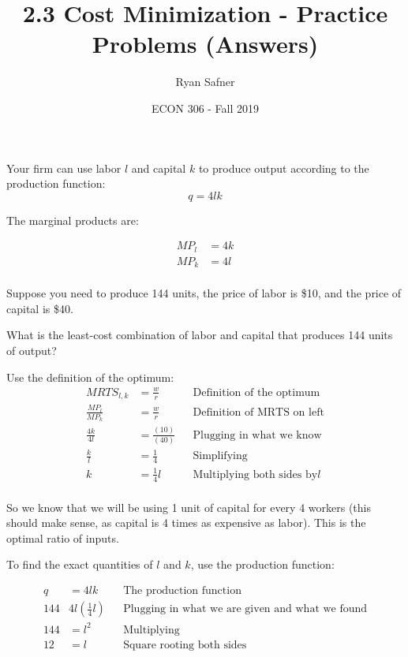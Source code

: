 \documentclass[12 pt]{exam}
\title{2.3 Cost Minimization - Practice Problems (Answers)}
\author{Ryan Safner}
\date{ECON 306 - Fall 2019}
\begin{document}
\maketitle

Your firm can use labor $l$ and capital $k$ to produce output according to the production function:
$$q=4lk$$


The marginal products are:

$$\begin{aligned}
MP_l &=4k \\
MP_k &=4l \\ \end{aligned}$$

Suppose you  need to produce 144 units, the price of labor is \$10, and the price of capital is \$40. 

\begin{questions}

\question What is the least-cost combination of labor and capital that produces 144 units of output?

  \begin{solution}
  	Use the definition of the optimum: 
\begin{align*}
MRTS_{l,k}&=\frac{w}{r} & & \text{Definition of the optimum}\\
\frac{MP_l}{MP_k}&=\frac{w}{r} && \text{Definition of MRTS on left}\\
\frac{4k}{4l} &=\frac{(10)}{(40)} & & \text{Plugging in what we know}\\
		\frac{k}{l}&=\frac{1}{4} && \text{Simplifying}\\
	k&=\frac{1}{4}l && \text{Multiplying both sides by} l\\	
\end{align*}

So we know that we will be using 1 unit of capital for every 4 workers (this should make sense, as capital is 4 times as expensive as labor). This is the optimal ratio of inputs. 

To find the exact quantities of $l$ and $k$, use the production function:

\begin{align*}
q&=4lk & & \text{The production function}\\
144&4l(\frac{1}{4}l) & & \text{Plugging in what we are given and what we found}\\
144&=l^2 & & \text{Multiplying}\\
12&=l & & \text{Square rooting both sides}\\
\end{align*}


\end{solution}
\end{questions}
\end{document}
